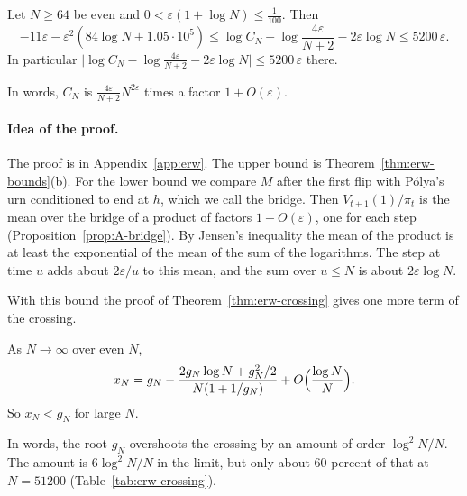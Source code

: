 \begin{proposition}\label{prop:second-order}
Let $N\ge64$ be even and $0<\varepsilon(1+\log N)\le\frac1{100}$. Then
\[
 -11\varepsilon-\varepsilon^2(84\log N+1.05\cdot10^5)
 \le\log C_N-\log\frac{4\varepsilon}{N+2}-2\varepsilon\log N\le5200\,\varepsilon .
\]
In particular
$\bigl\lvert\log C_N-\log\frac{4\varepsilon}{N+2}-2\varepsilon\log N\bigr\rvert
\le5200\,\varepsilon$ there.
\end{proposition}

In words, $C_N$ is $\frac{4\varepsilon}{N+2}N^{2\varepsilon}$ times a factor
$1+O(\varepsilon)$.

\paragraph{Idea of the proof.}
The proof is in Appendix~\ref{app:erw}. The upper bound is
Theorem~\ref{thm:erw-bounds}(b). For the lower bound we compare $M$ after
the first flip with P\'olya's urn conditioned to end at $h$, which we call
the bridge. Then $V_{t+1}(1)/\pi_t$ is the mean over the bridge of a product
of factors $1+O(\varepsilon)$, one for each step
(Proposition~\ref{prop:A-bridge}). By Jensen's inequality the mean of the
product is at least the exponential of the mean of the sum of the
logarithms. The step at time $u$ adds about $2\varepsilon/u$ to this mean,
and the sum over $u\le N$ is about $2\varepsilon\log N$.

With this bound the proof of Theorem~\ref{thm:erw-crossing} gives one more
term of the crossing.

\begin{proposition}\label{prop:refined}
As $N\to\infty$ over even $N$,
\[
 x_N=g_N-\frac{2g_N\log N+g_N^2/2}{N(1+1/g_N)}+O\Bigl(\frac{\log N}N\Bigr).
\]
So $x_N<g_N$ for large $N$.
\end{proposition}

In words, the root $g_N$ overshoots the crossing by an amount of order $\log^2N/N$. The
amount is $6\log^2N/N$ in the limit, but only about 60 percent of that at $N=51200$
(Table~\ref{tab:erw-crossing}).

